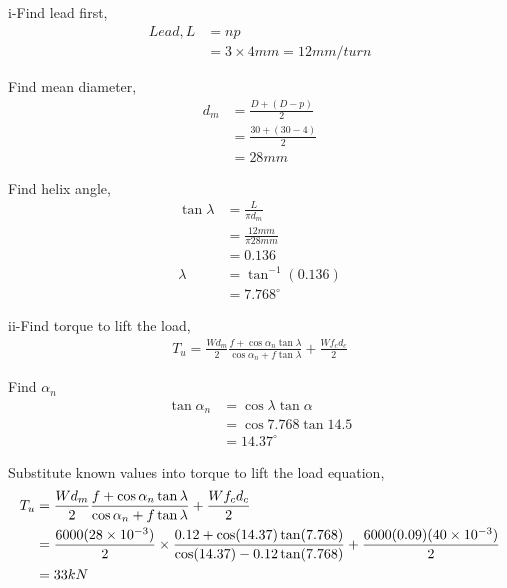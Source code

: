 \documentclass[a4paper, fleqn]{article}
\providecommand{\sci}[1]{\protect\ensuremath{\times 10^{\StrSubstitute[0]{#1}{e}{}}}}
\begin{document}
i-Find lead first,
\begin{equation*}
    \begin{aligned}
    Lead, L &=np\\
    &=3\times4mm = 12mm/turn    
    \end{aligned}
\end{equation*}

Find mean diameter,
\begin{equation*}
    \begin{aligned}
    d_m &= \frac {D+(D-p)}{2}\\  
    &= \frac {30+(30-4)}{2}\\ 
    &= 28mm
    \end{aligned}
\end{equation*}

Find helix angle,
\begin{equation*}
    \begin{aligned}
    \tan\lambda &= \frac{L}{\pi d_m}\\
    &= \frac{12mm}{\pi 28mm} \\
    &=0.136\\
    \lambda &= \tan^{-1}(0.136)\\
    &=7.768^{\circ}
    \end{aligned}
\end{equation*}

ii-Find torque to lift the load,
\begin{equation*}
    \begin{aligned}
    T_u = \frac{Wd_m}{2} \frac{f+\cos\alpha_n \tan\lambda}{\cos\alpha_n + f\tan\lambda} + \frac{Wf_c d_c}{2}
    \end{aligned}
\end{equation*}

Find $\alpha_n$
\begin{equation*}
    \begin{aligned}
    \tan \alpha_n &= \cos \lambda \tan \alpha\\
     &= \cos 7.768 \tan 14.5\\
    &= 14.37^{\circ}
    \end{aligned}
\end{equation*}

Substitute known values into torque to lift the load equation,
\begin{equation*}
    \begin{aligned}
    T_u &= \frac{Wd_m}{2} \frac{f+\cos\alpha_n \tan\lambda}{\cos\alpha_n + f\tan\lambda} + \frac{Wf_c d_c}{2} \\
    &= \frac{6000(28\sci{e-3})}{2} \times\frac{0.12+\cos(14.37) \tan(7.768)}{\cos(14.37) - 0.12\tan(7.768)} + \frac{6000(0.09)(40\sci{e-3})}{2} \\
    &= 33 kN
    \end{aligned}
\end{equation*}
\end{document}
